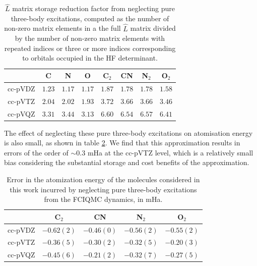 \begin{table}[htbp]
    \centering
    \begin{tabular}{cccccccc}
            & C      & N      & O      &
              C$_2$  & CN     & N$_2$  & O$_2$  \\
    \hline \hline
    cc-pVDZ & $1.23$ & $1.17$ & $1.17$ &
              $1.87$ & $1.78$ & $1.78$ & $1.58$ \\
    cc-pVTZ & $2.04$ & $2.02$ & $1.93$ &
              $3.72$ & $3.66$ & $3.66$ & $3.46$ \\
    cc-pVQZ & $3.31$ & $3.44$ & $3.13$ &
              $6.60$ & $6.54$ & $6.57$ & $6.41$ \\
    \hline
    \end{tabular}
    \caption{
      $\hat L$ matrix storage reduction factor from neglecting
      pure three-body excitations, computed as the number of
      non-zero matrix elements in a the full $\hat L$ matrix
      divided by the number of non-zero matrix elements with
      repeated indices or three or more indices corresponding to
      orbitals occupied in the HF determinant.
    }
    \label{table:no3_memory}
\end{table}

The effect of neglecting these pure three-body excitations on atomisation energy is also small, as shown in table \ref{table:no3_Eat_error}. We find that this approximation results in errors of the order of
$\sim0.3$ mHa at the cc-pVTZ level, which is a relatively small bias
considering the substantial storage and cost benefits of the
approximation.

\begin{table}[htbp]
    \centering
    \begin{tabular}{cllll}
                              &
    \multicolumn{1}{c}{C$_2$} &
    \multicolumn{1}{c}{CN   } &
    \multicolumn{1}{c}{N$_2$} &
    \multicolumn{1}{c}{O$_2$} \\
    \hline \hline
    cc-pVDZ   & $-0.62(2)$ & $-0.46(0)$ & $-0.56(2)$ & $-0.55(2)$ \\
    cc-pVTZ   & $-0.36(5)$ & $-0.30(2)$ & $-0.32(5)$ & $-0.20(3)$ \\
    cc-pVQZ   & $-0.45(6)$ & $-0.21(2)$ & $-0.32(7)$ & $-0.27(5)$ \\
    \hline
    \end{tabular}
    \caption{
      Error in the atomization energy of the molecules considered in this
      work incurred by neglecting pure three-body excitations from the
      FCIQMC dynamics, in mHa.
      \label{table:no3_Eat_error}}
  \end{table}

